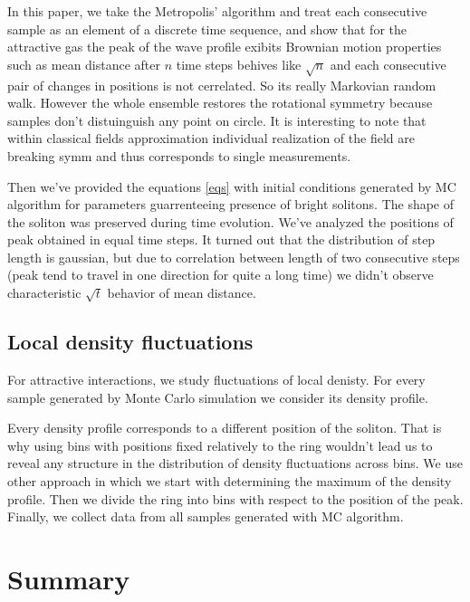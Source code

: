 \documentclass{article}
\begin{document}
    In this paper, we take the Metropolis' algorithm and treat each consecutive sample as an element of a discrete time sequence, and show that for the attractive gas the peak of the wave profile exibits Brownian motion properties such as mean distance after $n$ time steps behives like $\sqrt{n}$ and each consecutive pair of changes in positions is not cerrelated. So its really Markovian random walk. However the whole ensemble restores the rotational symmetry because samples don't distuinguish any point on circle.  
    It is interesting to note that within classical fields approximation individual realization of the field are breaking symm and thus corresponds to single measurements.
    
    Then we've provided the equations \ref{eqs} with initial conditions generated by MC algorithm for parameters guarrenteeing presence of bright solitons. The shape of the soliton was preserved during time evolution. We've analyzed the positions of peak obtained in equal time steps. It turned out that the distribution of step length is gaussian, but due to correlation between length of two consecutive steps (peak tend to travel in one direction for quite a long time) we didn't observe characteristic $\sqrt{t}$ behavior of mean distance. 
\subsection{Local density fluctuations}
    For attractive interactions, we study fluctuations of local denisty. For every sample generated by Monte Carlo simulation we consider its density profile.
    
    Every density profile corresponds to a different position of the soliton. That is why using bins with positions fixed relatively to the ring wouldn't lead us to reveal any structure in the distribution of density fluctuations across bins. We use other approach in which we start with determining the maximum of the density profile. Then we divide the ring into bins with respect to the position of the peak. Finally, we collect data from all samples generated with MC algorithm.

\section{Summary}


\end{document}
